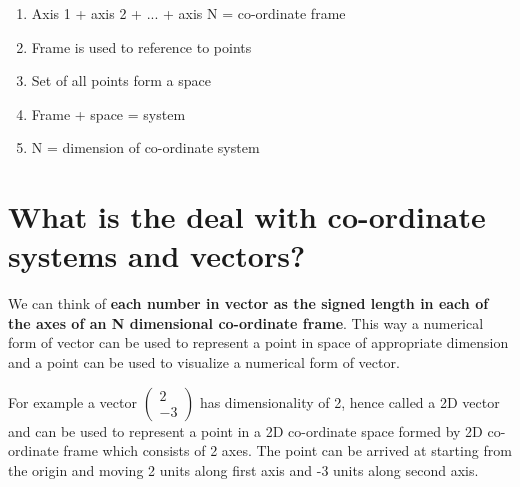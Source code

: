 \documentclass[12pt]{article}
\newcommand{\comment}[1]{}
\begin{document}
\begin{enumerate}
  \item Axis 1 + axis 2 + ... + axis N = co-ordinate frame
  \item Frame is used to reference to points
  \item Set of all points form a space
  \item Frame + space = system
  \item N = dimension of co-ordinate system
\end{enumerate}

\section{What is the deal with co-ordinate systems and vectors?}
We can think of \textbf{each number in vector as the signed length in each of the axes of an N dimensional co-ordinate frame}.
This way a numerical form of vector can be used to represent a point in space of appropriate dimension and a point can be used to visualize a numerical form of vector.

\begin{figure}[h]
  \centering
\end{figure}


For example a vector $ \comment{Column-Vector: 2, -3} \begin{pmatrix} 2 \\  -3 \end{pmatrix} $  has dimensionality of 2, hence called a 2D vector and can be used to represent a point in a 2D co-ordinate space formed by 2D co-ordinate frame which consists of 2 axes. The point can be arrived at starting from the origin and moving 2 units along first axis and -3 units along second axis.

\begin{figure}[ht]
  \centering
\end{figure}
\end{document}

